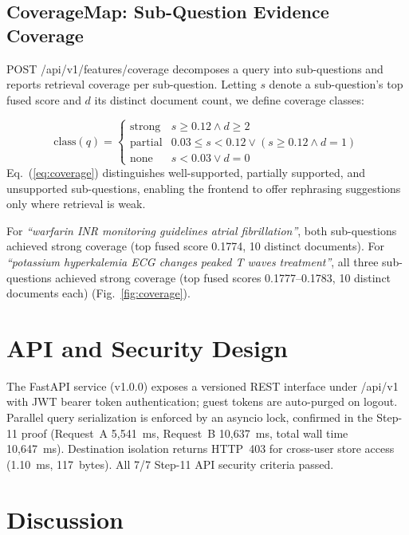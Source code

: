 \documentclass[conference]{IEEEtran}
\begin{document}
\subsection{CoverageMap: Sub-Question Evidence Coverage}

POST /api/v1/features/coverage decomposes a query into sub-questions and
reports retrieval coverage per sub-question. Letting $s$ denote a
sub-question's top fused score and $d$ its distinct document count, we define
coverage classes:

\begin{equation}
\mathrm{class}(q) =
\begin{cases}
\text{strong}  & s \ge 0.12 \wedge d \ge 2 \\
\text{partial} & 0.03 \le s < 0.12 \vee (s \ge 0.12 \wedge d = 1) \\
\text{none}    & s < 0.03 \vee d = 0
\end{cases}
\label{eq:coverage}
\end{equation}
Eq.~(\ref{eq:coverage}) distinguishes well-supported, partially supported, and
unsupported sub-questions, enabling the frontend to offer rephrasing suggestions
only where retrieval is weak.

For \emph{``warfarin INR monitoring guidelines atrial fibrillation''}, both
sub-questions achieved strong coverage (top fused score 0.1774, 10 distinct
documents). For \emph{``potassium hyperkalemia ECG changes peaked T waves
treatment''}, all three sub-questions achieved strong coverage (top fused
scores 0.1777--0.1783, 10 distinct documents each) (Fig.~\ref{fig:coverage}).

\section{API and Security Design}

The FastAPI service (v1.0.0) exposes a versioned REST interface under
/api/v1 with JWT bearer token authentication; guest tokens are auto-purged on
logout. Parallel query serialization is enforced by an asyncio lock, confirmed
in the Step-11 proof (Request~A 5{,}541~ms, Request~B 10{,}637~ms, total wall
time 10{,}647~ms). Destination isolation returns HTTP~403 for cross-user store
access (1.10~ms, 117~bytes). All 7/7 Step-11 API security criteria passed.

\section{Discussion}
\end{document}
